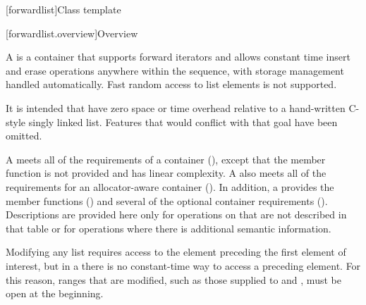 [forwardlist]{Class template }

[forwardlist.overview]{Overview}

\pnum
A  is a container that supports forward iterators and allows
constant time insert and erase operations anywhere within the sequence, with storage
management handled automatically. Fast random access to list elements is not supported.
\begin{note}
It is intended that  have zero space or time overhead
relative to a hand-written C-style singly linked list. Features that would conflict with
that goal have been omitted.
\end{note}

\pnum
A  meets all of the requirements of a container
(), except that the 
member function is not provided and  has linear complexity.
A  also meets all of the requirements for an allocator-aware
container (). In addition, a 
provides the  member functions
() and several of the optional
container requirements ().
Descriptions are provided here only for operations on
 that are not described in that table or for operations where there
is additional semantic information.

\pnum
\begin{note}
Modifying any list requires access to the element preceding the first element
of interest, but in a  there is no constant-time way to access a
preceding element. For this reason, ranges that are modified, such as those supplied to
 and , must be open at the beginning.
\end{note}

